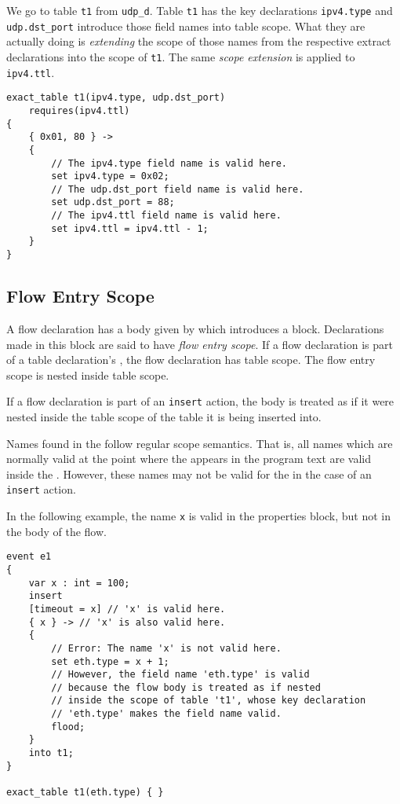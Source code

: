 We go to table \texttt{t1} from \texttt{udp\_d}. Table \texttt{t1} has the key declarations \texttt{ipv4.type} and \texttt{udp.dst\_port} introduce those field names into table scope. What they are actually doing is \textit{extending} the scope of those names from the respective extract declarations into the scope of \texttt{t1}. The same \textit{scope extension} is applied to \texttt{ipv4.ttl}.

\begin{minip}
\begin{lstlisting}
exact_table t1(ipv4.type, udp.dst_port)
	requires(ipv4.ttl)
{
	{ 0x01, 80 } ->
	{
		// The ipv4.type field name is valid here.
		set ipv4.type = 0x02;
		// The udp.dst_port field name is valid here.
		set udp.dst_port = 88;
		// The ipv4.ttl field name is valid here.
		set ipv4.ttl = ipv4.ttl - 1;
	}
}
\end{lstlisting}
\end{minip}

\subsection{Flow Entry Scope} \label{flow_scope}

A flow declaration has a body given by  which introduces a block. Declarations made in this block are said to have \textit{flow entry scope}. If a flow declaration is part of a table declaration's , the flow declaration has table scope. The flow entry scope is nested inside table scope.

If a flow declaration is part of an \texttt{insert} action, the body is treated as if it were nested inside the table scope of the table it is being inserted into.

Names found in the  follow regular scope semantics. That is, all names which are normally valid at the point where the  appears in the program text are valid inside the . However, these names may not be valid for the  in the case of an \texttt{insert} action.

In the following example, the name \texttt{x} is valid in the properties block, but not in the body of the flow.

\begin{minip}
\begin{lstlisting}
event e1
{
	var x : int = 100;
	insert
	[timeout = x] // 'x' is valid here.
	{ x } -> // 'x' is also valid here.
	{
		// Error: The name 'x' is not valid here.
		set eth.type = x + 1;
		// However, the field name 'eth.type' is valid
		// because the flow body is treated as if nested
		// inside the scope of table 't1', whose key declaration
		// 'eth.type' makes the field name valid.
		flood;
	}
	into t1;
}

exact_table t1(eth.type) { }
\end{lstlisting}
\end{minip}

